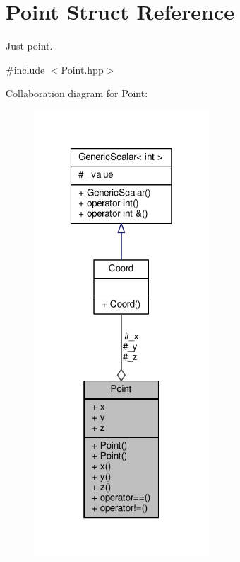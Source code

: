 \hypertarget{struct_point}{\section{Point Struct Reference}
\label{struct_point}
}


Just point.  




{\ttfamily \#include $<$Point.\-hpp$>$}



Collaboration diagram for Point\-:
\nopagebreak
\begin{figure}[H]
\begin{center}
\leavevmode
\includegraphics[width=186pt]{struct_point__coll__graph}
\end{center}
\end{figure}
